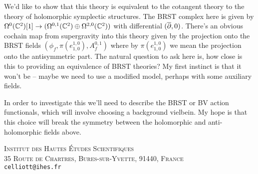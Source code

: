 \documentclass[10pt, oneside]{article}
\begin{document}
\begin{example}[4d $\mc N=1$ supergravity]
We'd like to show that this theory is equivalent to the cotangent theory to the theory of holomorphic symplectic structures.  The BRST complex here is given by $\Omega^0(\mathbb{C}^2)[1] \to (\Omega^{0,1}(\mathbb{C}^2) \oplus \Omega^{2,0}(\mathbb{C}^2))$ with differential $(\overline{\partial},0)$.  There's an obvious cochain map from supergravity into this theory given by the projection onto the BRST fields $(\phi_f, \pi (e^{1,0}_{1,0}), A^{0,1}_f)$ where by $\pi (e^{1,0}_{1,0})$ we mean the projection onto the antisymmetric part.  The natural question to ask here is, how close is this to providing an equivalence of BRST theories?  My first instinct is that it won't be -- maybe we need to use a modified model, perhaps with some auxiliary fields.

In order to investigate this we'll need to describe the BRST or BV action functionals, which will involve choosing a background vielbein.  My hope is that this choice will break the symmetry between the holomorphic and anti-holomorphic fields above.

\end{example}



\pagestyle{bib}
\printbibliography

\textsc{Institut des Hautes \'Etudes Scientifiques}\\
\textsc{35 Route de Chartres, Bures-sur-Yvette, 91440, France}\\
\texttt{celliott@ihes.fr}
\end{document}
